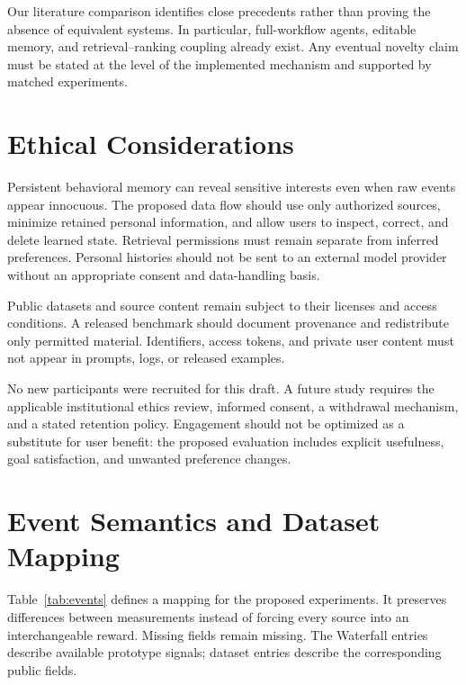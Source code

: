 \documentclass[11pt]{article}
\begin{document}
Our literature comparison identifies close precedents rather than proving the absence of equivalent systems. In particular, full-workflow agents, editable memory, and retrieval--ranking coupling already exist. Any eventual novelty claim must be stated at the level of the implemented mechanism and supported by matched experiments.

\section*{Ethical Considerations}

Persistent behavioral memory can reveal sensitive interests even when raw events appear innocuous. The proposed data flow should use only authorized sources, minimize retained personal information, and allow users to inspect, correct, and delete learned state. Retrieval permissions must remain separate from inferred preferences. Personal histories should not be sent to an external model provider without an appropriate consent and data-handling basis.

Public datasets and source content remain subject to their licenses and access conditions. A released benchmark should document provenance and redistribute only permitted material. Identifiers, access tokens, and private user content must not appear in prompts, logs, or released examples.

No new participants were recruited for this draft. A future study requires the applicable institutional ethics review, informed consent, a withdrawal mechanism, and a stated retention policy. Engagement should not be optimized as a substitute for user benefit: the proposed evaluation includes explicit usefulness, goal satisfaction, and unwanted preference changes.




\appendix

\section{Event Semantics and Dataset Mapping}
\label{app:events}

Table~\ref{tab:events} defines a mapping for the proposed experiments. It preserves differences between measurements instead of forcing every source into an interchangeable reward. Missing fields remain missing. The Waterfall entries describe available prototype signals; dataset entries describe the corresponding public fields.
\end{document}
